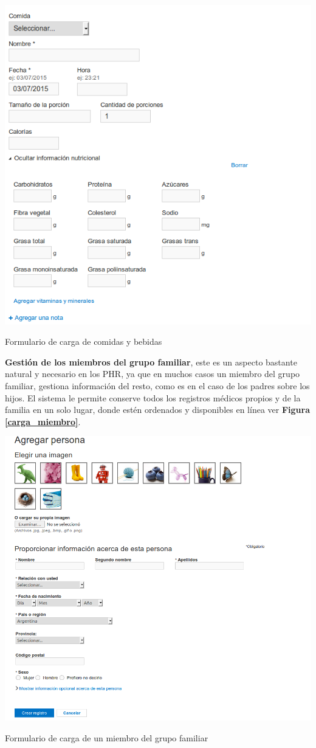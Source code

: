 \begin{itemize}
{	\begin{correccionFigure}[h]
      \centering
      \includegraphics[width=.8\textwidth]{img/tp1/3-carga_comidas}
      \caption{Formulario de carga de comidas y bebidas}
      \label{carga_comidas}
    \end{correccionFigure} 
    }
\clearpage
 {\correccionTexto
\item \textbf{Gestión de los miembros del grupo familiar}, este es un aspecto bastante natural y necesario en los PHR, ya que en muchos casos un miembro del grupo familiar, gestiona información del resto, como es en el caso de los padres sobre los hijos. El sistema le permite conserve todos los registros médicos propios y de la familia en un solo lugar, donde estén ordenados y disponibles en línea ver \textbf{Figura \ref{carga_miembro}}. 

	\begin{correccionFigure}[h]
      \centering
      \includegraphics[width=.8\textwidth]{img/tp1/3-carga_miembro}
      \caption{Formulario de carga de un miembro del grupo familiar}
      \label{carga_miembro}
    \end{correccionFigure} 
    
}
\end{itemize}
